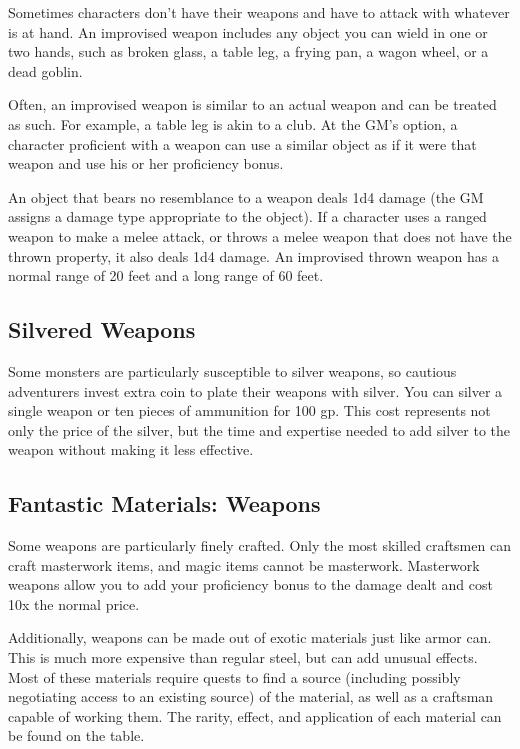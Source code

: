 Sometimes characters don't have their weapons and have to attack with whatever is at hand. An improvised weapon includes any object you can wield in one or two hands, such as broken glass, a table leg, a frying pan, a wagon wheel, or a dead goblin.

Often, an improvised weapon is similar to an actual weapon and can be treated as such. For example, a table leg is akin to a club. At the GM's option, a character proficient with a weapon can use a similar object as if it were that weapon and use his or her proficiency bonus.

An object that bears no resemblance to a weapon deals 1d4 damage (the GM assigns a damage type appropriate to the object). If a character uses a ranged weapon to make a melee attack, or throws a melee weapon that does not have the thrown property, it also deals 1d4 damage. An improvised thrown weapon has a normal range of 20 feet and a long range of 60 feet.

\subsection{Silvered Weapons}

Some monsters are particularly susceptible to silver weapons, so cautious adventurers invest extra coin to plate their weapons with silver. You can silver a single weapon or ten pieces of ammunition for 100 gp. This cost represents not only the price of the silver, but the time and expertise needed to add silver to the weapon without making it less effective.

\subsection{Fantastic Materials: Weapons}
Some weapons are particularly finely crafted. Only the most skilled craftsmen can craft masterwork items, and magic items cannot be masterwork. Masterwork weapons allow you to add your proficiency bonus to the damage dealt and cost 10x the normal price.

Additionally, weapons can be made out of exotic materials just like armor can. This is much more expensive than regular steel, but can add unusual effects. Most of these materials require quests to find a source (including possibly negotiating access to an existing source) of the material, as well as a craftsman capable of working them. The rarity, effect, and application of each material can be found on the  table.

